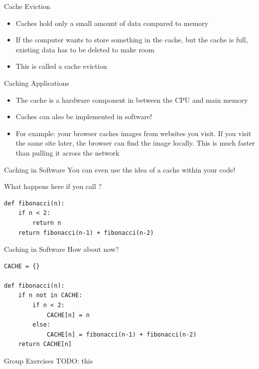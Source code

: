 \begin{frame}{Cache Eviction}
	\begin{itemize}
		\item Caches hold only a small amount of data compared to memory
		\item If the computer wants to store something in the cache, but the cache is full, existing data has to be deleted to make room
		\item This is called a cache eviction
	\end{itemize}
\end{frame}

\begin{frame}{Caching Applications}
	\begin{itemize}
		\item The cache is a hardware component in between the CPU and main memory
		\item Caches can also be implemented in software!
		\item For example: your browser caches images from websites you visit. If you visit the same site later, the browser can find the image locally. This is much faster than pulling it across the network
	\end{itemize}
\end{frame}

\begin{frame}[fragile]{Caching in Software}
	You can even use the idea of a cache within your code!

	What happens here if you call ?
	\begin{verbatim}
def fibonacci(n):
	if n < 2:
		return n
	return fibonacci(n-1) + fibonacci(n-2)
\end{verbatim}

\end{frame}


\begin{frame}[fragile]{Caching in Software}
	How about now?
	\begin{verbatim}
CACHE = {}

def fibonacci(n):
	if n not in CACHE:
		if n < 2:
			CACHE[n] = n
		else:
			CACHE[n] = fibonacci(n-1) + fibonacci(n-2)
	return CACHE[n]
\end{verbatim}

\end{frame}

\begin{frame}{Group Exercises}
	TODO: this
\end{frame}


